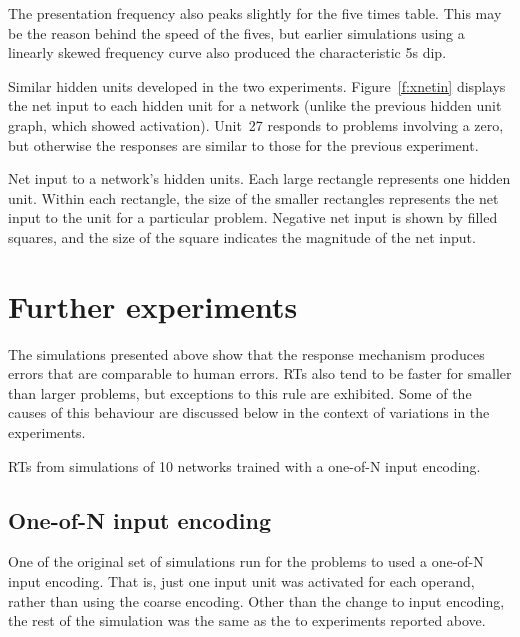 The presentation frequency also peaks slightly for the five times table.
This may be the reason behind the speed of the fives, but earlier
simulations using a linearly skewed frequency curve also produced the
characteristic 5s dip.

Similar hidden units developed in the two experiments.
Figure~\ref{f:xnetin} displays the net input to each hidden unit for a
network (unlike the previous hidden unit graph, which showed activation).
Unit~27 responds to problems involving a zero, but otherwise the responses
are similar to those for the previous experiment.

\begin{fancyfigure}
\centerline{}
\caption{Net input to a network's hidden units.  Each large rectangle
represents one hidden unit.  Within each rectangle, the size of the smaller
rectangles represents the net input to the unit for a particular problem.
Negative net input is shown by filled squares, and the size of the square
indicates the magnitude of the net input.}
\label{f:xnetin}
\end{fancyfigure}



\section{Further experiments}\label{s:variations}

The simulations presented above show that the response mechanism produces
errors that are comparable to human errors.  RTs also tend to be faster for
smaller than larger problems, but exceptions to this rule are exhibited.
Some of the causes of this behaviour are discussed below in the context of
variations in the experiments.

\begin{fancyfigure}
\centerline{}
\caption{RTs from simulations of 10 networks trained with a one-of-N input
encoding.}
\label{f:oneofnrt}
\end{fancyfigure}

\subsection{One-of-N input encoding}\label{s:oneofn}

One of the original set of simulations run for the problems  to 
used a one-of-N input encoding.  That is, just one input unit was activated
for each operand, rather than using the coarse
encoding.  Other than the change
to input encoding, the rest of the simulation was the same as the  to
 experiments reported above.

